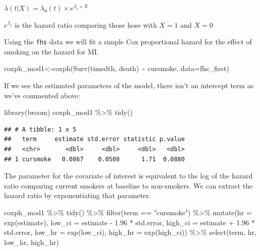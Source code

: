 \documentclass[
]{book}
\newenvironment{Shaded}{\begin{snugshade}}{\end{snugshade}}
\newcommand{\AttributeTok}[1]{\textcolor[rgb]{0.77,0.63,0.00}{#1}}
\newcommand{\FloatTok}[1]{\textcolor[rgb]{0.00,0.00,0.81}{#1}}
\newcommand{\FunctionTok}[1]{\textcolor[rgb]{0.00,0.00,0.00}{#1}}
\newcommand{\NormalTok}[1]{#1}
\newcommand{\OtherTok}[1]{\textcolor[rgb]{0.56,0.35,0.01}{#1}}
\newcommand{\SpecialCharTok}[1]{\textcolor[rgb]{0.00,0.00,0.00}{#1}}
\newcommand{\StringTok}[1]{\textcolor[rgb]{0.31,0.60,0.02}{#1}}
\begin{document}
\(\lambda(t|X)=\lambda_{0}(t)\times e^{\beta_{1}\times X}\)

\(e^{\beta_{1}}\) is the hazard ratio comparing those hose with \(X=1\) and \(X=0\)

Using the \texttt{fhs} data we will fit a simple Cox proportional hazard for the effect of smoking on the hazard for MI.

\begin{Shaded}
\begin{Highlighting}[]
\NormalTok{coxph\_mod1}\OtherTok{\textless{}{-}}\FunctionTok{coxph}\NormalTok{(}\FunctionTok{Surv}\NormalTok{(timedth, death) }\SpecialCharTok{\textasciitilde{}}\NormalTok{ cursmoke, }\AttributeTok{data=}\NormalTok{fhs\_first)}
\end{Highlighting}
\end{Shaded}

If we see the estimated parameters of the model, there isn't an intercept term as we've commented above:

\begin{Shaded}
\begin{Highlighting}[]
\FunctionTok{library}\NormalTok{(broom)}
\NormalTok{coxph\_mod1 }\SpecialCharTok{\%\textgreater{}\%}
\FunctionTok{tidy}\NormalTok{()}
\end{Highlighting}
\end{Shaded}

\begin{verbatim}
## # A tibble: 1 x 5
##   term     estimate std.error statistic p.value
##   <chr>       <dbl>     <dbl>     <dbl>   <dbl>
## 1 cursmoke   0.0867    0.0508      1.71  0.0880
\end{verbatim}

The parameter for the covariate of interest is equivalent to the log of the hazard ratio comparing current smokers at baseline to non-smokers. We can extract the hazard ratio by exponentiating that parameter.

\begin{Shaded}
\begin{Highlighting}[]
\NormalTok{coxph\_mod1 }\SpecialCharTok{\%\textgreater{}\%} 
  \FunctionTok{tidy}\NormalTok{() }\SpecialCharTok{\%\textgreater{}\%} 
  \FunctionTok{filter}\NormalTok{(term }\SpecialCharTok{==} \StringTok{"cursmoke"}\NormalTok{) }\SpecialCharTok{\%\textgreater{}\%} 
  \FunctionTok{mutate}\NormalTok{(}\AttributeTok{hr =} \FunctionTok{exp}\NormalTok{(estimate),}
         \AttributeTok{low\_ci =}\NormalTok{ estimate }\SpecialCharTok{{-}} \FloatTok{1.96} \SpecialCharTok{*}\NormalTok{ std.error, }
         \AttributeTok{high\_ci =}\NormalTok{ estimate }\SpecialCharTok{+} \FloatTok{1.96} \SpecialCharTok{*}\NormalTok{ std.error, }
         \AttributeTok{low\_hr =} \FunctionTok{exp}\NormalTok{(low\_ci), }
         \AttributeTok{high\_hr =} \FunctionTok{exp}\NormalTok{(high\_ci)) }\SpecialCharTok{\%\textgreater{}\%} 
  \FunctionTok{select}\NormalTok{(term, hr, low\_hr, high\_hr)}
\end{Highlighting}
\end{Shaded}
\end{document}
